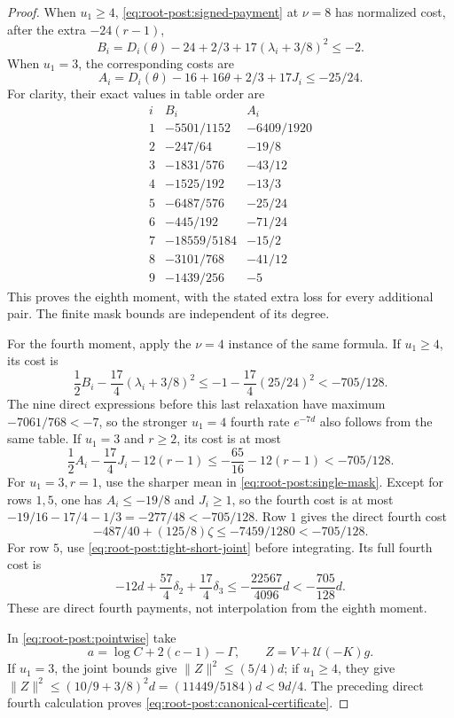 \begin{proof}
When \(u_1\ge4\), \eqref{eq:root-post:signed-payment} at \(\nu=8\)
has normalized cost, after the extra \(-24(r-1)\),
\[
 B_i=D_i(\theta)-24+2/3+17(\lambda_i+3/8)^2\le-2.
\]
When \(u_1=3\), the corresponding costs are
\[
 A_i=D_i(\theta)-16+16\theta+2/3+17J_i
 \le-25/24.
\]
For clarity, their exact values in table order are
\[
 \begin{array}{c|rr}
 i&B_i&A_i\\ \hline
 1&-5501/1152&-6409/1920\\
 2&-247/64&-19/8\\
 3&-1831/576&-43/12\\
 4&-1525/192&-13/3\\
 5&-6487/576&-25/24\\
 6&-445/192&-71/24\\
 7&-18559/5184&-15/2\\
 8&-3101/768&-41/12\\
 9&-1439/256&-5
 \end{array}
\]
This proves the eighth moment, with the stated extra loss for every
additional pair. The finite mask bounds are independent of its degree.

For the fourth moment, apply the \(\nu=4\) instance of the same
formula. If \(u_1\ge4\), its cost is
\[
 \frac12B_i-\frac{17}{4}(\lambda_i+3/8)^2
 \le-1-\frac{17}{4}(25/24)^2<-705/128.
\]
The nine direct expressions before this last relaxation have maximum
\(-7061/768<-7\), so the stronger \(u_1=4\) fourth rate
\(e^{-7d}\) also follows from the same table.
If \(u_1=3\) and \(r\ge2\), its cost is at most
\[
 \frac12A_i-\frac{17}{4}J_i-12(r-1)
 \le-\frac{65}{16}-12(r-1)<-705/128.
\]
For \(u_1=3,r=1\), use the sharper mean in
\eqref{eq:root-post:single-mask}. Except for rows \(1,5\), one has
\(A_i\le-19/8\) and \(J_i\ge1\), so the fourth cost is at most
\(-19/16-17/4-1/3=-277/48<-705/128\).
Row \(1\) gives the direct fourth cost
\[
 -487/40+(125/8)\zeta\le-7459/1280<-705/128.
\]
For row \(5\), use \eqref{eq:root-post:tight-short-joint} before
integrating. Its full fourth cost is
\[
 -12d+\frac{57}{4}\delta_2+\frac{17}{4}\delta_3
 \le-\frac{22567}{4096}d<-\frac{705}{128}d .
\]
These are direct fourth payments, not interpolation from the eighth
moment.

In \eqref{eq:root-post:pointwise} take
\[
 a=\log C+2(c-1)-\Gamma,\qquad
 Z=V+\mathcal U(-K)g .
\]
If \(u_1=3\), the joint bounds give \(\|Z\|^2\le(5/4)d\);
if \(u_1\ge4\), they give
\(\|Z\|^2\le(10/9+3/8)^2d=(11449/5184)d<9d/4\).
The preceding direct fourth calculation proves
\eqref{eq:root-post:canonical-certificate}.
\end{proof}

